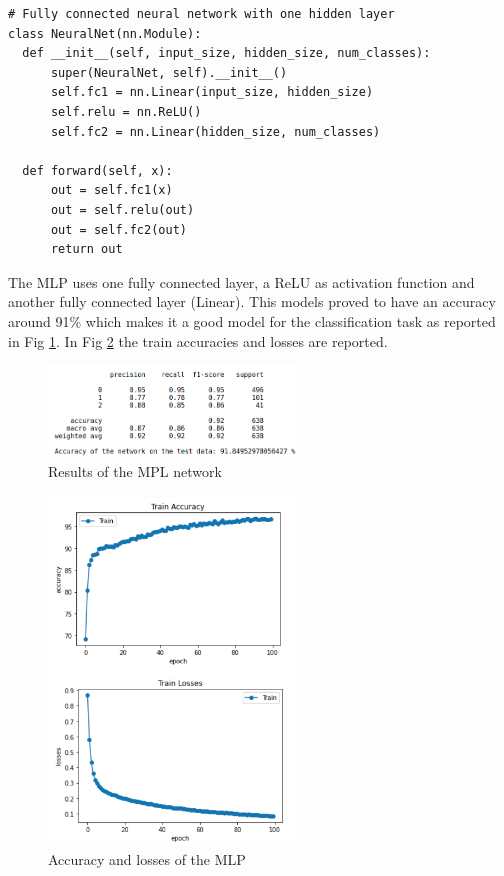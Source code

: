 \documentclass[a4paper,12pt]{article}
\begin{document}
\begin{Verbatim}[fontsize=\small]
# Fully connected neural network with one hidden layer
class NeuralNet(nn.Module):
  def __init__(self, input_size, hidden_size, num_classes):
      super(NeuralNet, self).__init__()
      self.fc1 = nn.Linear(input_size, hidden_size) 
      self.relu = nn.ReLU()
      self.fc2 = nn.Linear(hidden_size, num_classes)  
  
  def forward(self, x):
      out = self.fc1(x)
      out = self.relu(out)
      out = self.fc2(out)
      return out
\end{Verbatim}

\noindent The MLP uses one fully connected layer, a ReLU as activation function and another fully connected layer (Linear). This models proved to have an accuracy around 91\% which makes it a good model for the classification task as reported in Fig \ref{fig:annres}. In Fig \ref{fig:anntrain} the train accuracies and losses are reported.

\begin{figure}[H]
  \begin{center}
  \includegraphics[width=0.6\textwidth]{images/ann_res.png}
  \end{center}
  \caption{Results of the MPL network}
  \label{fig:annres}
\end{figure}


\begin{figure}[H]
  \begin{center}
  \includegraphics[width=0.6\textwidth]{images/ann_train.png}
  \end{center}
  \caption{Accuracy and losses of the MLP}
  \label{fig:anntrain}
\end{figure}
\end{document}
